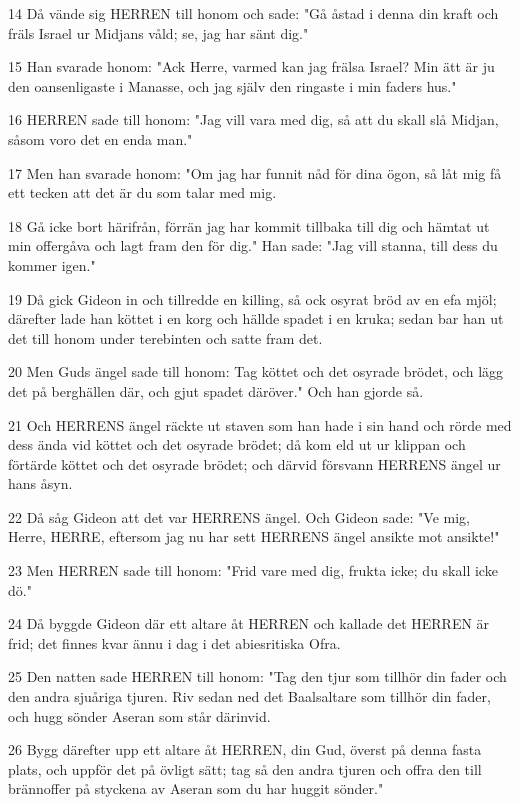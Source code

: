\par 14 Då vände sig HERREN till honom och sade: "Gå åstad i denna din kraft och fräls Israel ur Midjans våld; se, jag har sänt dig."
\par 15 Han svarade honom: "Ack Herre, varmed kan jag frälsa Israel? Min ätt är ju den oansenligaste i Manasse, och jag själv den ringaste i min faders hus."
\par 16 HERREN sade till honom: "Jag vill vara med dig, så att du skall slå Midjan, såsom voro det en enda man."
\par 17 Men han svarade honom: "Om jag har funnit nåd för dina ögon, så låt mig få ett tecken att det är du som talar med mig.
\par 18 Gå icke bort härifrån, förrän jag har kommit tillbaka till dig och hämtat ut min offergåva och lagt fram den för dig." Han sade: "Jag vill stanna, till dess du kommer igen."
\par 19 Då gick Gideon in och tillredde en killing, så ock osyrat bröd av en efa mjöl; därefter lade han köttet i en korg och hällde spadet i en kruka; sedan bar han ut det till honom under terebinten och satte fram det.
\par 20 Men Guds ängel sade till honom: Tag köttet och det osyrade brödet, och lägg det på berghällen där, och gjut spadet däröver." Och han gjorde så.
\par 21 Och HERRENS ängel räckte ut staven som han hade i sin hand och rörde med dess ända vid köttet och det osyrade brödet; då kom eld ut ur klippan och förtärde köttet och det osyrade brödet; och därvid försvann HERRENS ängel ur hans åsyn.
\par 22 Då såg Gideon att det var HERRENS ängel. Och Gideon sade: "Ve mig, Herre, HERRE, eftersom jag nu har sett HERRENS ängel ansikte mot ansikte!"
\par 23 Men HERREN sade till honom: "Frid vare med dig, frukta icke; du skall icke dö."
\par 24 Då byggde Gideon där ett altare åt HERREN och kallade det HERREN är frid; det finnes kvar ännu i dag i det abiesritiska Ofra.
\par 25 Den natten sade HERREN till honom: "Tag den tjur som tillhör din fader och den andra sjuåriga tjuren. Riv sedan ned det Baalsaltare som tillhör din fader, och hugg sönder Aseran som står därinvid.
\par 26 Bygg därefter upp ett altare åt HERREN, din Gud, överst på denna fasta plats, och uppför det på övligt sätt; tag så den andra tjuren och offra den till brännoffer på styckena av Aseran som du har huggit sönder."
